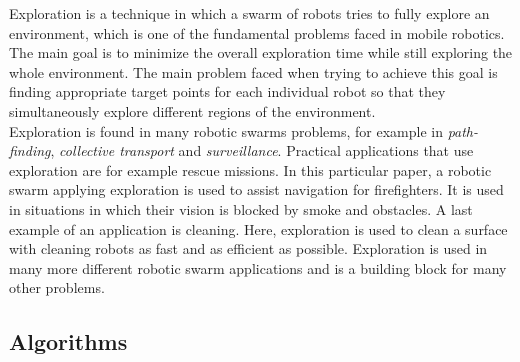 
Exploration is a technique in which a swarm of robots tries to fully explore an environment, which is one of the fundamental problems faced in mobile robotics. 
The main goal is to minimize the overall exploration time while still exploring the whole environment. 
The main problem faced when trying to achieve this goal is finding appropriate target points for each individual robot so that they simultaneously explore different regions of the environment. \cite{burgard2005coordinated} \\
Exploration is found in many robotic swarms problems, for example in \emph{path-finding}, \emph{collective transport} and \emph{surveillance}.
Practical applications that use exploration are for example rescue missions. \cite{Naghsh2008,Penders2011}
In this particular paper, a robotic swarm applying exploration is used to assist navigation for firefighters.
It is used in situations in which their vision is blocked by smoke and obstacles. 
A last example of an application is cleaning. \cite{wagner2008cooperative}
Here, exploration is used to clean a surface with cleaning robots as fast and as efficient as possible. 
Exploration is used in many more different robotic swarm applications and is a building block for many other problems.



\subsection{Algorithms}

